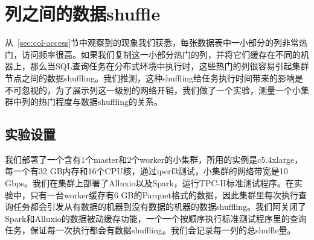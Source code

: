 \section{列之间的数据shuffle}
\label{sec:data-shuffle}

\par 从~\ref{sec:col-access}节中观察到的现象我们获悉，每张数据表中一小部分的列非常热门，访问频率很高。如果我们复制这一小部分热门的列，并将它们缓存在不同的机器上，那么当SQL查询任务在分布式环境中执行时，这些热门的列很容易引起集群节点之间的数据shuffling。我们推测，这种shuffling给任务执行时间带来的影响是不可忽视的，为了展示列这一级别的网络开销，我们做了一个实验，测量一个小集群中列的热门程度与数据shuffling的关系。

\subsection{实验设置}
\label{subsec:data-shuffle-setup}

\par 我们部署了一个含有1个master和2个worker的小集群，所用的实例是c5.4xlarge，每一个有32 GB内存和16个CPU核，通过iperf3测试，小集群的网络带宽是10 Gbps。我们在集群上部署了Alluxio以及Spark，运行TPC-H标准测试程序。在实验中，只有一台worker缓存有6 GB的Parquet格式的数据，因此集群里每次执行查询任务都会引发从有数据的机器到没有数据的机器的数据shuffling。我们阿关闭了Spark和Alluxio的数据被动缓存功能，一个一个按顺序执行标准测试程序里的查询任务，保证每一次执行都会有数据shuffling。我们会记录每一列的总shuffle量。

